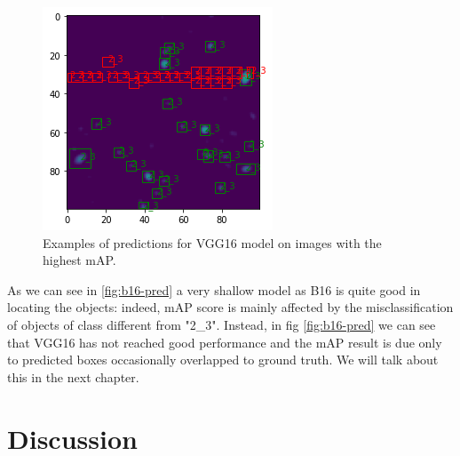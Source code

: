 \documentclass[a4paper,10pt]{report}
\begin{document}
\begin{figure}[!htb]
  \endminipage\hfill
  \includegraphics[width=\linewidth]{vgg16_735_17476_17879_100.png}
  \endminipage\hfill
  \caption{Examples of predictions for VGG16 model on images with the highest mAP.}
  \label{fig:vgg16-pred}
\end{figure}



As we can see in \ref{fig:b16-pred} a very shallow model as B16 is quite good in locating the objects: indeed, mAP score is mainly affected by the misclassification of objects of class different from "2\_3".
Instead, in fig \ref{fig:b16-pred} we can see that VGG16 has not reached good performance and the mAP result is due only to predicted boxes occasionally overlapped to ground truth.
We will talk about this in the next chapter.

\vspace*{2cm}
{\let\clearpage\relax\chapter{Discussion}\label{chap:discussion}}
\end{document}
